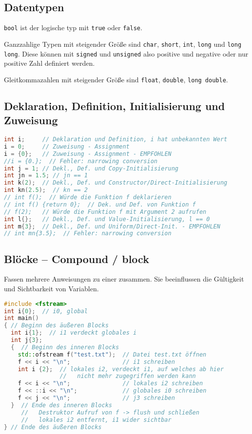 \subsection{Datentypen}

\lstinline|bool| ist der logische typ mit \lstinline|true| oder
\lstinline|false|.

Ganzzahlige Typen mit steigender Größe sind \lstinline|char|, \lstinline|short|,
\lstinline|int|, \lstinline|long| und \lstinline|long long|. Diese können mit
\lstinline|signed| und \lstinline|unsigned| also positive und negative oder nur
positive Zahl definiert werden.

Gleitkommazahlen mit steigender Größe sind \lstinline|float|,
\lstinline|double|, \lstinline|long double|.

\subsection{Deklaration, Definition, Initialisierung und Zuweisung}

\begin{lstlisting}[language=C++]
int i;     // Deklaration und Definition, i hat unbekannten Wert
i = 0;     // Zuweisung - Assignment
i = {0};   // Zuweisung - Assignment - EMPFOHLEN
//i = {0.};  // Fehler: narrowing conversion
int j = 1; // Dekl., Def. und Copy-Initialisierung
int jn = 1.5; // jn == 1
int k(2);  // Dekl., Def. und Constructor/Direct-Initialisierung
int kn(2.5);  // kn == 2
// int f();  // Würde die Funktion f deklarieren
// int f() {return 0};  // Dek. und Def. von Funktion f
// f(2);   // Würde die Funktion f mit Argument 2 aufrufen
int l{};   // Dekl., Def. und Value-Initialisierung, l == 0
int m{3};  // Dekl., Def. und Uniform/Direct-Init. - EMPFOHLEN
// int mn{3.5};  // Fehler: narrowing conversion
\end{lstlisting}

\subsection{Blöcke -- Compound / block}

Fassen mehrere Anweisungen zu einer zusammen. Sie beeinflussen die Gültigkeit
und Sichtbarkeit von Variablen.

\begin{lstlisting}[language=C++]
#include <fstream>
int i{0};  // i0, global
int main()
{ // Beginn des äußeren Blocks
  int i{1};  // i1 verdeckt globales i
  int j{3};
  {  // Beginn des inneren Blocks
    std::ofstream f("test.txt");  // Datei test.txt öffnen
    f << i << "\n";               // i1 schreiben
    int i {2};  // lokales i2, verdeckt i1, auf welches ab hier
                //   nicht mehr zugegriffen werden kann
    f << i << "\n";               // lokales i2 schreiben
    f << ::i << "\n";             // globales i0 schreiben
    f << j << "\n";               // j3 schreiben
  }  // Ende des inneren Blocks
     //   Destruktor Aufruf von f -> flush und schließen
     //   lokales i2 entfernt, i1 wider sichtbar
} // Ende des äußeren Blocks
\end{lstlisting}